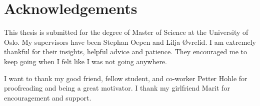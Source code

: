 \chapter*{Acknowledgements}
\thispagestyle{empty}

This thesis is submitted for the degree of Master of Science at the University of Oslo. My supervisors have been Stephan Oepen and Lilja Øvrelid. I am extremely thankful for their insights, helpful advice and patience. They encouraged me to keep going when I felt like I was not going anywhere.

I want to thank my good friend, fellow student, and co-worker Petter Hohle for proofreading and being a great motivator. I thank my girlfriend Marit for encouragement and support.